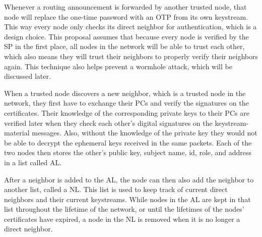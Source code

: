 Whenever a routing announcement is forwarded by another trusted node, that
node will replace the one-time password with an \ac{OTP} from its own keystream.
This way every node only checks its direct neighbor for authentication, which is
a design choice. This proposal assumes that because every node is verified by
the \ac{SP} in the first place, all nodes in the network will be able to trust
each other, which also means they will trust their neighbors to properly verify
their neighbors again. This technique also helps prevent a wormhole attack,
which will be discussed later.


When a trusted node discovers a new neighbor, which is a trusted node in the
network, they first have to exchange their \acp{PC} and verify the signatures
on the certificates. Their knowledge of the corresponding private keys to their
\acp{PC} are verified later when they check each other's digital signatures on
the keystream-material messages. Also, without the knowledge of the private key
they would not be able to decrypt the ephemeral keys received in the same
packets. Each of the two nodes then stores the other's public key, subject name,
id, role, and address in a list called \ac{AL}.


After a neighbor is added to the \ac{AL}, the node can then also add the
neighbor to another list, called a \ac{NL}. This list is used to keep
track of current direct neighbors and their current keystreams. While nodes in
the \ac{AL} are kept in that list throughout the lifetime of the network, or
until the lifetimes of the nodes' certificates have expired, a node in the
\ac{NL} is removed when it is no longer a direct neighbor. 

